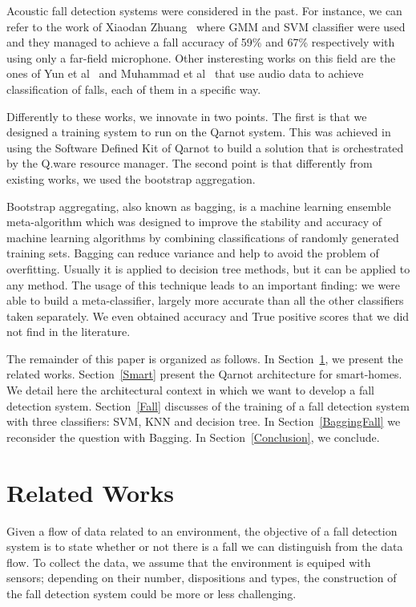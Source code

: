 \documentclass[10pt, conference, compsocconf]{IEEEtran}
\begin{document}
Acoustic fall detection systems were considered in the past. For instance, we can refer to the work of Xiaodan Zhuang~\cite{Xiaodan2009} where GMM and SVM classifier were used and they managed to achieve a fall accuracy of 59\% and 67\% respectively with using only a far-field microphone. Other insteresting works on this field are the ones of Yun et al~\cite{Yun2012} and Muhammad et al~\cite{Muhammad2014} that use audio data to achieve classification of falls, each of them in a specific way.  

Differently to these works, we innovate in two points. The first is that we designed a training system to run on 
the Qarnot system. This was achieved in using the Software Defined Kit of Qarnot to build a solution that is orchestrated by 
the Q.ware resource manager. The second point is that differently from existing works, we used the  bootstrap aggregation. 

Bootstrap aggregating, also known as bagging, is a machine learning ensemble meta-algorithm which was designed to improve the stability and accuracy of machine learning algorithms by combining classifications of randomly generated training sets. Bagging can reduce variance and help to avoid the problem of overfitting. Usually it is applied to decision tree methods, but it can be applied to any method. The usage of this technique leads to an important finding: we were able to build a meta-classifier, 
largely more accurate than all the other classifiers taken separately. We even obtained accuracy and True positive scores that 
we did not find in the literature. 

The remainder of this paper is organized as follows. In Section~\ref{Related}, we present the related works. Section~\ref{Smart} 
present the Qarnot architecture for smart-homes. We detail here the architectural context in which we want to develop a fall 
detection system. Section~\ref{Fall} discusses of the training of a fall detection system with three classifiers: SVM, KNN and decision tree. 
In Section~\ref{BaggingFall} we reconsider the question with Bagging. In Section~\ref{Conclusion}, we conclude.

\section{Related Works} \label{Related}

Given a flow of data related to an environment, the objective of a fall detection system is to state whether or not 
there is a fall we can distinguish from the data flow. To collect the data, we assume that the environment 
is equiped with sensors; depending on their number, dispositions and types, the construction of the fall detection system 
could be more or less challenging. 
\end{document}
